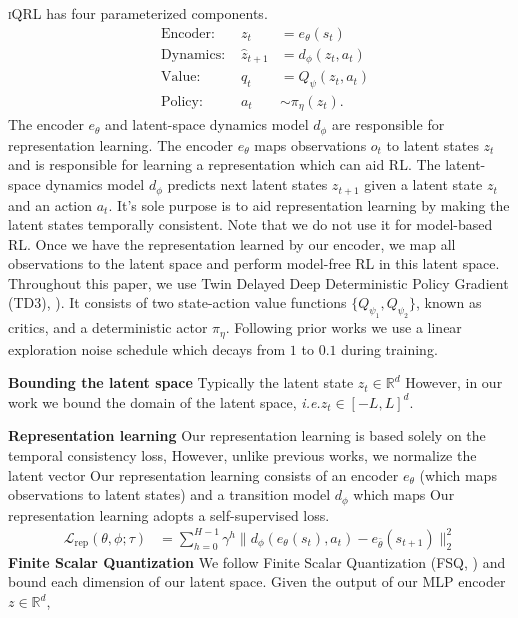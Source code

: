\documentclass{article}
\makeatletter
\theoremstyle{plain}
\theoremstyle{definition}
\theoremstyle{remark}
\newcommand{\our}{\textsc{iQRL}\xspace}
\newcommand{\ie}{\textit{i.e.\@}\xspace}
\newcommand{\E}{\mathbb{E}}
\newcommand{\R}{\mathbb{R}}
\makeatother
\begin{document}
\our has four parameterized components.
\begin{align}
&\text{Encoder: } & z_{t} &= e_{\theta} (s_{t}) \label{eq:encoder} \\
&\text{Dynamics: } & \hat{z}_{t+1} &= d_{\phi} (z_{t}, a_{t}) \label{eq:transition} \\
&\text{Value: } & q_{t} &= Q_{\psi} (z_{t}, a_{t}) \label{eq:value} \\
&\text{Policy: } & a_{t} &\sim \pi_{\eta} (z_{t}) . \label{eq:policy}
\end{align}
The encoder $e_{\theta}$  and latent-space dynamics model $d_{\phi}$ are responsible for representation learning.
The encoder $e_{\theta}$ maps observations $o_{t}$ to latent states $z_{t}$ and is responsible for learning a representation
which can aid RL.
The latent-space dynamics model $d_{\phi}$ predicts next latent states $z_{t+1}$ given a latent state $z_{t}$ and an action $a_{t}$.
It's sole purpose is to aid representation learning by making the latent states temporally consistent.
Note that we do not use it for model-based RL.
Once we have the representation learned by our encoder, we map all observations to the latent space and perform model-free RL
in this latent space.
Throughout this paper, we use Twin Delayed Deep Deterministic Policy Gradient
(TD3), \citep{fujimotoAddressingFunctionApproximation2018}).
It consists of two state-action value functions $\{Q_{\psi_{1}},Q_{\psi_{2}} \}$, known as critics, and a deterministic
actor $\pi_{\eta}$.
Following prior works \citep{yaratsMasteringVisualContinuous2021} we use a linear exploration noise schedule
which decays from $1$ to $0.1$ during training.

\textbf{Bounding the latent space}
Typically the latent state $z_{t} \in \R^{d}$
However, in our work we bound the domain of the latent space, \ie $z_{t} \in [-L, L]^{d}$.

\textbf{Representation learning}
Our representation learning is based solely on the temporal consistency loss,
However, unlike previous works, we normalize the latent vector
Our representation learning consists of an encoder $e_{\theta}$ (which maps observations to
latent states) and a transition model $d_{\phi}$ which maps
Our representation learning adopts a self-supervised loss.
%
\begin{align} \label{eq:rep-loss}
  \mathcal{L}_{\text{rep}}(\theta, \phi; \tau)
&= \sum_{h=0}^{H-1} \gamma^{h} \| d_{\phi}(e_{\theta}(s_{t}), a_{t}) - e_{\bar{\theta}}(s_{t+1}) \|_{2}^{2}
\end{align}
%
\textbf{Finite Scalar Quantization}
We follow Finite Scalar Quantization (FSQ, \cite{mentzerFiniteScalarQuantization2023})
and bound each dimension of our latent space.
Given the output of our MLP encoder $z \in \R^{d}$,
\end{document}

